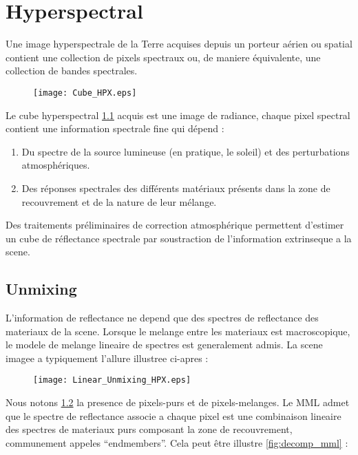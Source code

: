 \chapter{Hyperspectral}

Une image hyperspectrale de la Terre acquises depuis
un porteur aérien ou spatial contient une collection de pixels
spectraux ou, de maniere équivalente, une collection de bandes
spectrales.

\begin{figure}[h]
  \centering
  \texttt{[image: Cube\_HPX.eps]}
  \label{fig:cube}
\end{figure}

Le cube hyperspectral \ref{fig:cube} acquis est une image de
radiance, chaque pixel spectral contient une information spectrale
fine qui dépend : 

\begin{enumerate}
\item{Du spectre de la source lumineuse (en pratique, le
soleil) et des perturbations atmosphériques.}
\item{Des réponses spectrales
des différents matériaux présents dans la zone de recouvrement et de la nature de leur mélange.}
\end{enumerate}

Des traitements préliminaires de
correction atmosphérique permettent d'estimer un cube de réflectance
spectrale par soustraction de l'information extrinseque a la
scene. 

\section{Unmixing}

L'information de reflectance ne depend que des spectres de
reflectance des materiaux de la scene. Lorsque le melange entre les
materiaux est macroscopique, le modele de melange lineaire de spectres
est generalement admis. La scene imagee a typiquement l'allure
illustree ci-apres :

\begin{figure}[h]
  \centering
  \texttt{[image: Linear\_Unmixing\_HPX.eps]}
  \label{fig:linear_unmixing}
\end{figure}

Nous notons \ref{fig:linear_unmixing}  la
presence de pixels-purs et de pixels-melanges. Le MML admet que le
spectre de reflectance associe a chaque pixel est une combinaison
lineaire des spectres de materiaux purs composant la zone de
recouvrement, communement appeles ``endmembers''. Cela peut être
illustre \ref{fig:decomp_mml} :

